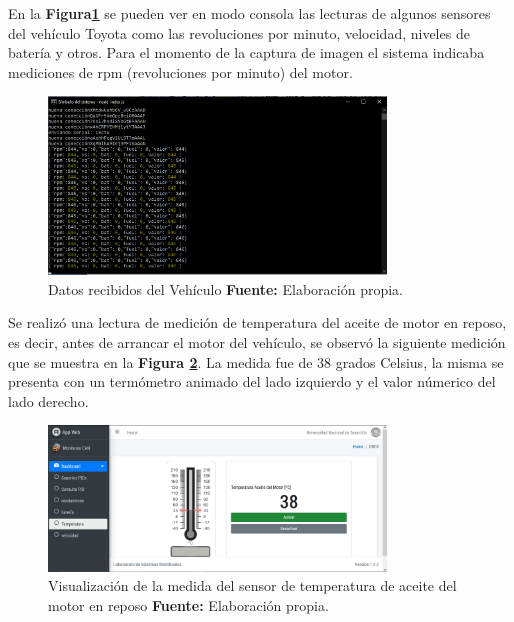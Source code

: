 En la \textbf{ Figura\ref{consola_ref_c6}} se pueden ver en modo consola las lecturas de algunos sensores del vehículo Toyota como las revoluciones por minuto, velocidad, niveles de batería y otros. Para el momento de la captura de imagen el sistema indicaba mediciones de rpm (revoluciones por minuto) del motor. 

\begin{figure}[H]
	\centering
	\includegraphics[width=0.8\textwidth]{./Cap6imagen/consola_fig_c6.png}
	\caption [Datos recibidos del Vehículo.]{Datos recibidos del Vehículo \textbf{ Fuente:} %
		Elaboración propia.}
	\label{consola_ref_c6} %
\end{figure}


 Se realizó una lectura de medición de temperatura del aceite de motor en reposo, es decir,  antes de arrancar el motor del vehículo, se observó la siguiente medición que se muestra en la \textbf{Figura \ref{temp_ref_c6}}. La medida fue de 38 grados Celsius, la misma se presenta con un termómetro animado del lado izquierdo y el valor númerico del lado derecho.
 
 \begin{figure}[H]
	\centering
	\includegraphics[width=0.8\textwidth]{./Cap6imagen/temp_fig_c6.png}
	\caption [Visualización de la medida del sensor de temperatura de aceite del motor en reposo.]{Visualización de la medida del sensor de temperatura de aceite del motor en reposo \textbf{ Fuente:} %
		Elaboración propia.}
	\label{temp_ref_c6} %
\end{figure}

